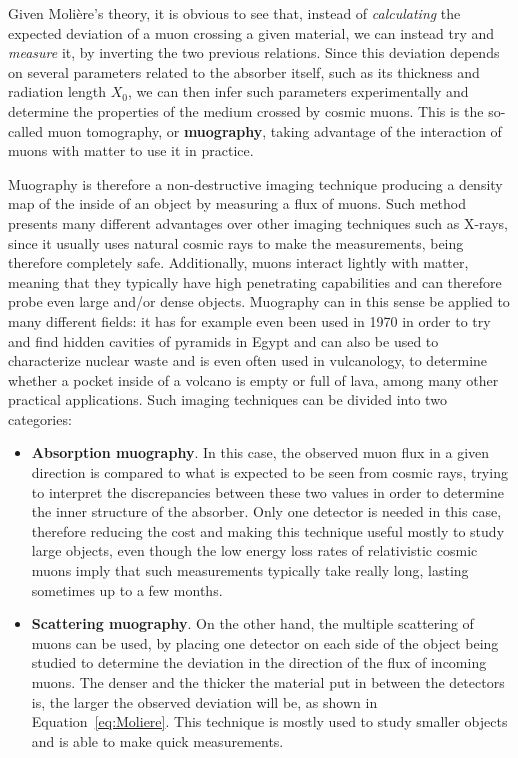 \documentclass[a4paper, 11pt]{report}
\begin{document}
Given Moli\`ere's theory, it is obvious to see that, instead of \textit{calculating} the expected deviation of a muon crossing a given material, we can instead try and \textit{measure} it, by inverting the two previous relations. Since this deviation depends on several parameters related to the absorber itself, such as its thickness and radiation length $X_0$, we can then infer such parameters experimentally and determine the properties of the medium crossed by cosmic muons. This is the so-called muon tomography, or \textbf{muography}, taking advantage of the interaction of muons with matter to use it in practice.

Muography is therefore a non-destructive imaging technique producing a density map of the inside of an object by measuring a flux of muons. Such method presents many different advantages over other imaging techniques such as X-rays, since it usually uses natural cosmic rays to make the measurements, being therefore completely safe. Additionally, muons interact lightly with matter, meaning that they typically have high penetrating capabilities and can therefore probe even large and/or dense objects. Muography can in this sense be applied to many different fields: it has for example even been used in 1970 in order to try and find hidden cavities of pyramids in Egypt \cite{Egypt} and can also be used to characterize nuclear waste and is even often used in vulcanology, to determine whether a pocket inside of a volcano is empty or full of lava, among many other practical applications.
\newpage
Such imaging techniques can be divided into two categories:
\begin{itemize}
\item \textbf{Absorption muography}. In this case, the observed muon flux in a given direction is compared to what is expected to be seen from cosmic rays, trying to interpret the discrepancies between these two values in order to determine the inner structure of the absorber. Only one detector is needed in this case, therefore reducing the cost and making this technique useful mostly to study large objects, even though the low energy loss rates of relativistic cosmic muons imply that such measurements typically take really long, lasting sometimes up to a few months.
\item \textbf{Scattering muography}. On the other hand, the multiple scattering of muons can be used, by placing one detector on each side of the object being studied to determine the deviation in the direction of the flux of incoming muons. The denser and the thicker the material put in between the detectors is, the larger the observed deviation will be, as shown in Equation~\ref{eq:Moliere}. This technique is mostly used to study smaller objects and is able to make quick measurements.
\end{itemize}
\end{document}

